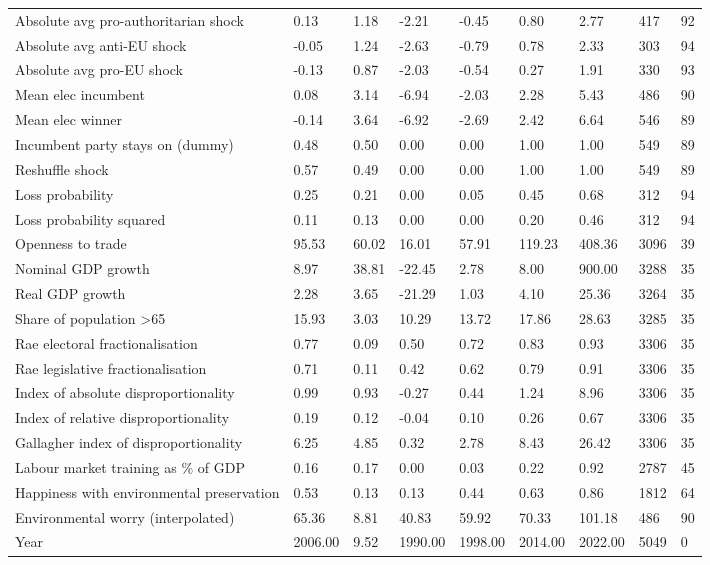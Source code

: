 \begin{longtable}{lllllllll}
Absolute avg pro-authoritarian shock & 0.13 & 1.18 & -2.21 & -0.45 & 0.80 & 2.77 & 417 & 92\\
Absolute avg anti-EU shock & -0.05 & 1.24 & -2.63 & -0.79 & 0.78 & 2.33 & 303 & 94\\
\addlinespace
Absolute avg pro-EU shock & -0.13 & 0.87 & -2.03 & -0.54 & 0.27 & 1.91 & 330 & 93\\
Mean elec incumbent & 0.08 & 3.14 & -6.94 & -2.03 & 2.28 & 5.43 & 486 & 90\\
Mean elec winner & -0.14 & 3.64 & -6.92 & -2.69 & 2.42 & 6.64 & 546 & 89\\
Incumbent party stays on (dummy) & 0.48 & 0.50 & 0.00 & 0.00 & 1.00 & 1.00 & 549 & 89\\
Reshuffle shock & 0.57 & 0.49 & 0.00 & 0.00 & 1.00 & 1.00 & 549 & 89\\
\addlinespace
Loss probability & 0.25 & 0.21 & 0.00 & 0.05 & 0.45 & 0.68 & 312 & 94\\
Loss probability squared & 0.11 & 0.13 & 0.00 & 0.00 & 0.20 & 0.46 & 312 & 94\\
Openness to trade & 95.53 & 60.02 & 16.01 & 57.91 & 119.23 & 408.36 & 3096 & 39\\
Nominal GDP growth & 8.97 & 38.81 & -22.45 & 2.78 & 8.00 & 900.00 & 3288 & 35\\
Real GDP growth & 2.28 & 3.65 & -21.29 & 1.03 & 4.10 & 25.36 & 3264 & 35\\
\addlinespace
Share of population >65 & 15.93 & 3.03 & 10.29 & 13.72 & 17.86 & 28.63 & 3285 & 35\\
Rae electoral fractionalisation & 0.77 & 0.09 & 0.50 & 0.72 & 0.83 & 0.93 & 3306 & 35\\
Rae legislative fractionalisation & 0.71 & 0.11 & 0.42 & 0.62 & 0.79 & 0.91 & 3306 & 35\\
Index of absolute disproportionality & 0.99 & 0.93 & -0.27 & 0.44 & 1.24 & 8.96 & 3306 & 35\\
Index of relative disproportionality & 0.19 & 0.12 & -0.04 & 0.10 & 0.26 & 0.67 & 3306 & 35\\
\addlinespace
Gallagher index of disproportionality & 6.25 & 4.85 & 0.32 & 2.78 & 8.43 & 26.42 & 3306 & 35\\
Labour market training as \% of GDP & 0.16 & 0.17 & 0.00 & 0.03 & 0.22 & 0.92 & 2787 & 45\\
Happiness with environmental preservation & 0.53 & 0.13 & 0.13 & 0.44 & 0.63 & 0.86 & 1812 & 64\\
Environmental worry (interpolated) & 65.36 & 8.81 & 40.83 & 59.92 & 70.33 & 101.18 & 486 & 90\\
Year & 2006.00 & 9.52 & 1990.00 & 1998.00 & 2014.00 & 2022.00 & 5049 & 0\\
\bottomrule
\end{longtable}
